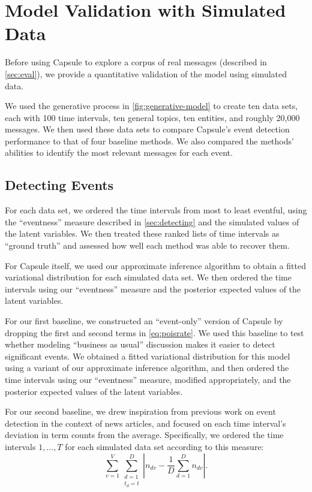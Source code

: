
\section{Model Validation with Simulated Data}
\label{sec:valid}

Before using Capsule to explore a corpus of real messages (described
in \cref{sec:eval}), we provide a quantitative validation of the model
using simulated data.

We used the generative process in \cref{fig:generative-model} to
create ten data sets, each with 100 time intervals, ten general
topics, ten entities, and roughly 20,000 messages. We then used these
data sets to compare Capsule's event detection performance to that of
four baseline methods. We also compared the methods' abilities to
identify the most relevant messages for each event.

\subsection{Detecting Events}
\label{sec:detecting_events}

For each data set, we ordered the time intervals from most to least
eventful, using the ``eventness'' measure described in
\cref{sec:detecting} and the simulated values of the latent
variables. We then treated these ranked lists of time intervals as
``ground truth'' and assessed how well each method was able to recover
them.

For Capsule itself, we used our approximate inference algorithm to
obtain a fitted variational distribution for each simulated data
set. We then ordered the time intervals using our ``eventness''
measure and the posterior expected values of the latent variables.

For our first baseline, we constructed an ``event-only'' version of
Capsule by dropping the first and second terms in
\cref{eq:poisrate}. We used this baseline to test whether modeling
``business as usual'' discussion makes it easier to detect significant
events. We obtained a fitted variational distribution for this model
using a variant of our approximate inference algorithm, and then
ordered the time intervals using our ``eventness'' measure, modified
appropriately, and the posterior expected values of the latent variables.

For our second baseline, we drew inspiration from previous work on
event detection in the context of news articles, and focused on each
time interval's deviation in term counts from the
average. Specifically, we ordered the time intervals $1, \ldots, T$
for each simulated data set according to this measure:
\begin{equation}
  \sum_{v=1}^V \sum_{\substack{d=1\\t_d \!=\! t}}^D \left\lvert n_{dv} - \frac{1}{D}\sum_{d=1}^D
  n_{dv} \right\rvert.
\label{eq:wordev}
\end{equation}

